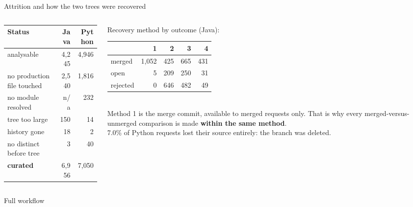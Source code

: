 \documentclass[11pt,aspectratio=169]{beamer}
\newcommand{\thesisfigH}[2]{{\rmfamily\resizebox{!}{#1}{}}}
\begin{document}
\begin{frame}{Attrition and how the two trees were recovered}
\begin{columns}[T,onlytextwidth]
\begin{column}{0.5\textwidth}
\footnotesize
\begin{tabular}{@{}lrr@{}}
\toprule
\textbf{Status} & \textbf{Java} & \textbf{Python} \\
\midrule
analysable & 4,245 & 4,946 \\
no production file touched & 2,540 & 1,816 \\
no module resolved & n/a & 232 \\
tree too large & 150 & 14 \\
history gone & 18 & 2 \\
no distinct before tree & 3 & 40 \\
\midrule
\textbf{curated} & 6,956 & 7,050 \\
\bottomrule
\end{tabular}
\end{column}
\begin{column}{0.46\textwidth}
\footnotesize
Recovery method by outcome (Java):\\[3pt]
\begin{tabular}{@{}lrrrr@{}}
\toprule
 & \textbf{1} & \textbf{2} & \textbf{3} & \textbf{4} \\
\midrule
merged & 1,052 & 425 & 665 & 431 \\
open & 5 & 209 & 250 & 31 \\
rejected & 0 & 646 & 482 & 49 \\
\bottomrule
\end{tabular}\\[5pt]
Method 1 is the merge commit, available to merged requests only. That is why every
merged-versus-unmerged comparison is made \textbf{within the same method}.\\[3pt]
7.0\% of Python requests lost their source entirely: the branch was deleted.
\end{column}
\end{columns}
\end{frame}

\begin{frame}{Full workflow}
\begin{center}
\thesisfigH{0.80\textheight}{fig_pipeline}
\end{center}
\end{frame}
\end{document}
